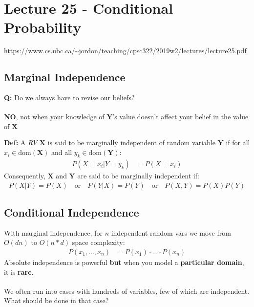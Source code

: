 \documentclass{article}
\def\blu#1{{\color{blu}#1}}
\def\gre#1{{\color{gre}#1}}
\begin{document}
\newpage

\section*{Lecture 25 - Conditional Probability}
\url{https://www.cs.ubc.ca/~jordon/teaching/cpsc322/2019w2/lectures/lecture25.pdf}

\subsection*{Marginal Independence}
\textbf{Q:} Do we always have to revise our beliefs?\\
\\
\textbf{\blu{NO}}, not when your knowledge of $\mathbf{Y}$’s value doesn't affect your belief in the value of $\mathbf{X}$
\begin{siderules}
\textbf{Def:} A \textit{RV} $\mathbf{X}$ is said to be marginally independent of random variable $\mathbf{Y}$ if for all $ x_i \in \text{dom}(\mathbf{X}) $ and all $ y_k \in \text{dom}(\mathbf{Y}) $:
\begin{align*}
P(X = x_i | Y = y_k) &= P(X = x_i)
\end{align*}
Consequently, $\mathbf{X}$ and $\mathbf{Y}$ are said to be marginally independent if:
\begin{align*}
P(X|Y) = P(X) \quad \text{or} \quad P(Y|X) = P(Y) \quad \text{or} \quad P(X, Y) = P(X) P(Y)
\end{align*}
	\end{siderules}

\subsection*{Conditional Independence}
With marginal independence, for $ n $ independent random vars we move from $ O(dn) $ to $ O(n*d) $ space complexity:
\gre{
\begin{align*}
P(x_1, \dots, x_n) &= P(x_1) \cdot \dots \cdot P(x_n)
\end{align*}
}
Absolute independence is powerful \textbf{but} when you model a \textbf{particular domain}, it is \textbf{rare}. \\
\\
We often run into cases with hundreds of variables, few of which are independent. What should be done in that case?
\end{document}
